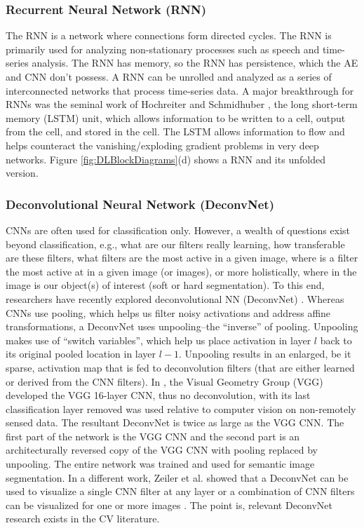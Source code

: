\documentclass[12pt]{spieman}
\begin{document}
\begin{spacing}{1}
\subsubsection{Recurrent Neural Network (RNN)}
The RNN is a network where connections form directed cycles. The RNN is primarily used for analyzing non-stationary processes such as speech and time-series analysis. The RNN has memory, so the RNN has persistence, which the AE and CNN don't possess. A RNN can be unrolled and analyzed as a series of interconnected networks that process time-series data. A major breakthrough for RNNs was the seminal work of Hochreiter and Schmidhuber \cite{hochreiter1997long} , the long short-term memory (LSTM) unit, which allows information to be written to a cell, output from the cell, and stored in the cell. The LSTM allows information to flow and helps counteract the vanishing/exploding gradient problems in very deep networks. Figure \ref{fig:DLBlockDiagrams}(d) shows a RNN and its unfolded version.

\subsubsection{Deconvolutional Neural Network (DeconvNet)}
CNNs are often used for classification only. However, a wealth of questions exist beyond classification, e.g., what are our filters really learning, how transferable are these filters, what filters are the most active in a given image, where is a filter the most active at in a given image (or images), or more holistically, where in the image is our object(s) of interest (soft or hard segmentation). To this end, researchers have recently explored deconvolutional NN (DeconvNet) \cite{zeiler2014visualizing,6126474,Zeiler10deconvolutionalnetworks,DBLP:journals/corr/NohHH15} . Whereas CNNs use pooling, which helps us filter noisy activations and address affine transformations, a DeconvNet uses unpooling--the ``inverse'' of pooling. Unpooling makes use of ``switch variables'', which help us place activation in layer $l$ back to its original pooled location in layer $l-1$. Unpooling results in an enlarged, be it sparse, activation map that is fed to deconvolution filters (that are either learned or derived from the CNN filters). In \cite{DBLP:journals/corr/NohHH15} , the Visual Geometry Group (VGG) developed the VGG 16-layer CNN, thus no deconvolution, with its last classification layer removed was used relative to computer vision on non-remotely sensed data. The resultant DeconvNet is twice as large as the VGG CNN. The first part of the network is the VGG CNN and the second part is an architecturally reversed copy of the VGG CNN with pooling replaced by unpooling. The entire network was trained and used for semantic image segmentation. In a different work, Zeiler et al. showed that a DeconvNet can be used to visualize a single CNN filter at any layer or a combination of CNN filters can be visualized for one or more images \cite{6126474,zeiler2014visualizing} . The point is, relevant DeconvNet research exists in the CV literature. 


\end{spacing}
\end{document}
